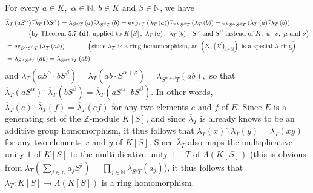 \documentclass[12pt,final,notitlepage,onecolumn,german]{article}%
\begin{document}
For every $a\in K,$ $\alpha\in\mathbb{N}$, $b\in K$ and $\beta\in\mathbb{N}$,
we have%
\begin{align*}
&  \overline{\lambda}_{T}\left(  aS^{\alpha}\right)  \widehat{\cdot}%
\overline{\lambda}_{T}\left(  bS^{\beta}\right)  =\lambda_{S^{\alpha}T}\left(
a\right)  \widehat{\cdot}\lambda_{S^{\beta}T}\left(  b\right)
=\operatorname*{ev}\nolimits_{S^{\alpha}T}\left(  \lambda_{T}\left(  a\right)
\right)  \widehat{\cdot}\operatorname*{ev}\nolimits_{S^{\beta}T}\left(
\lambda_{T}\left(  b\right)  \right)  =\operatorname*{ev}\nolimits_{S^{\alpha
}S^{\beta}T}\left(  \lambda_{T}\left(  a\right)  \widehat{\cdot}\lambda
_{T}\left(  b\right)  \right) \\
&  \ \ \ \ \ \ \ \ \ \ \left(  \text{by Theorem 5.7 \textbf{(d)}, applied to
}K\left[  S\right]  ,\text{ }\lambda_{T}\left(  a\right)  ,\text{ }\lambda
_{T}\left(  b\right)  ,\text{ }S^{\alpha}\text{ and }S^{\beta}\text{ instead
of }K,\text{ }u,\text{ }v,\text{ }\mu\text{ and }\nu\right) \\
&  =\operatorname*{ev}\nolimits_{S^{\alpha}S^{\beta}T}\left(  \lambda
_{T}\left(  ab\right)  \right)  \ \ \ \ \ \ \ \ \ \ \left(  \text{since
}\lambda_{T}\text{ is a ring homomorphism, as }\left(  K,\left(  \lambda
^{i}\right)  _{i\in\mathbb{N}}\right)  \text{ is a special }\lambda
\text{-ring}\right) \\
&  =\lambda_{S^{\alpha}S^{\beta}T}\left(  ab\right)  =\lambda_{S^{\alpha
+\beta}T}\left(  ab\right)
\end{align*}
and $\overline{\lambda}_{T}\left(  aS^{\alpha}\cdot bS^{\beta}\right)
=\overline{\lambda}_{T}\left(  ab\cdot S^{\alpha+\beta}\right)  =\lambda
_{S^{\alpha+\beta}T}\left(  ab\right)  ,$ so that $\overline{\lambda}%
_{T}\left(  aS^{\alpha}\right)  \widehat{\cdot}\overline{\lambda}_{T}\left(
bS^{\beta}\right)  =\overline{\lambda}_{T}\left(  aS^{\alpha}\cdot bS^{\beta
}\right)  $. In other words, $\overline{\lambda}_{T}\left(  e\right)
\widehat{\cdot}\overline{\lambda}_{T}\left(  f\right)  =\overline{\lambda}%
_{T}\left(  ef\right)  $ for any two elements $e$ and $f$ of $E$. Since $E$ is
a generating set of the $\mathbb{Z}$-module $K\left[  S\right]  $, and since
$\overline{\lambda}_{T}$ is already knows to be an additive group
homomorphism, it thus follows that $\overline{\lambda}_{T}\left(  x\right)
\widehat{\cdot}\overline{\lambda}_{T}\left(  y\right)  =\overline{\lambda}%
_{T}\left(  xy\right)  $ for any two elements $x$ and $y$ of $K\left[
S\right]  $. Since $\overline{\lambda}_{T}$ also maps the multiplicative unity
$1$ of $K\left[  S\right]  $ to the multiplicative unity $1+T$ of
$\Lambda\left(  K\left[  S\right]  \right)  $ (this is obvious from
$\overline{\lambda}_{T}\left(  \sum\limits_{j\in\mathbb{N}}a_{j}S^{j}\right)
=\prod\limits_{j\in\mathbb{N}}\lambda_{S^{j}T}\left(  a_{j}\right)  $), it
thus follows that $\overline{\lambda}_{T}:K\left[  S\right]  \rightarrow
\Lambda\left(  K\left[  S\right]  \right)  $ is a ring homomorphism.
\end{document}
